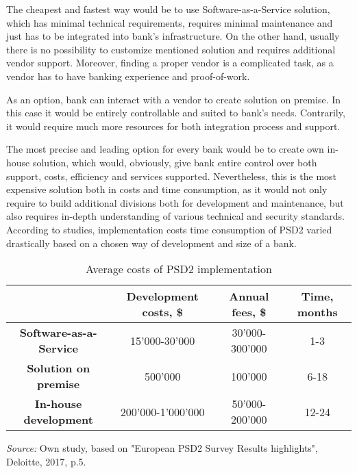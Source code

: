 The cheapest and fastest way would be to use Software-as-a-Service solution, which has minimal technical requirements, requires minimal maintenance and just has to be integrated into bank's infrastructure. 
On the other hand, usually there is no possibility to customize mentioned solution and requires additional vendor support. 
Moreover, finding a proper vendor is a complicated task, as a vendor has to have banking experience and proof-of-work.

As an option, bank can interact with a vendor to create solution on premise. 
In this case it would be entirely controllable and suited to bank's needs. 
Contrarily, it would require much more resources for both integration process and support.

The most precise and leading option for every bank would be to create own in-house solution, which would, obviously, give bank entire control over both support, costs, efficiency and services supported.
Nevertheless, this is the most expensive solution both in costs and time consumption, as it would not only require to build additional divisions both for development and maintenance, but also requires in-depth understanding of various technical and security standards.
According to studies, implementation costs time consumption of PSD2 varied drastically based on a chosen way of development and size of a bank. 
\cite{saltedge_open_banking_report}
\cite{deloitte_psd2_costs}

\begin{table}
    \centering
    \begin{tabular}{| c | c | c | c |}
        \hline
        &
        \textbf{Development costs, \$} & 
        \textbf{Annual fees, \$} &
        \textbf{Time, months} \\ \hline 
       
        \textbf{Software-as-a-Service} & 
            15'000-30'000 & 
            30'000-300'000 &
            1-3 \\ \hline 
       
        \textbf{Solution on premise} & 
            500'000 &
            100'000 &
            6-18 \\ \hline 

        \textbf{In-house development} &
            200'000-1'000'000 &
            50'000-200'000 &
            12-24 \\ \hline
    \end{tabular}
    \caption{Average costs of PSD2 implementation}
    \medskip
    \footnotesize\textit{Source:} Own study, based on "European PSD2 Survey Results highlights", Deloitte, 2017, p.5.
\end{table}

